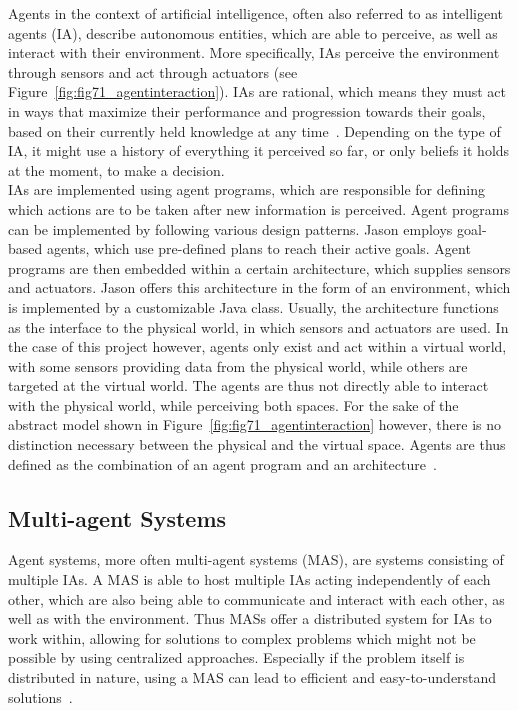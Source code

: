\documentclass[draft,final]{vutinfth} %
\begin{document}
Agents in the context of artificial intelligence, often also referred to as intelligent agents (IA), describe autonomous entities, which are able to perceive, as well as interact with their environment. 
More specifically, IAs perceive the environment through sensors and act through actuators (see Figure~\ref{fig:fig71_agentinteraction}). 
IAs are rational, which means they must act in ways that maximize their performance and progression towards their goals, based on their currently held knowledge at any time~\cite{russell2016artificial}. 
Depending on the type of IA, it might use a history of everything it perceived so far, or only beliefs it holds at the moment, to make a decision. \\
IAs are implemented using agent programs, which are responsible for defining which actions are to be taken after new information is perceived. 
Agent programs can be implemented by following various design patterns. 
Jason employs goal-based agents, which use pre-defined plans to reach their active goals. 
Agent programs are then embedded within a certain architecture, which supplies sensors and actuators.
Jason offers this architecture in the form of an environment, which is implemented by a customizable Java class. 
Usually, the architecture functions as the interface to the physical world, in which sensors and actuators are used. 
In the case of this project however, agents only exist and act within a virtual world, with some sensors providing data from the physical world, while others are targeted at the virtual world. 
The agents are thus not directly able to interact with the physical world, while perceiving both spaces. 
For the sake of the abstract model shown in Figure~\ref{fig:fig71_agentinteraction} however, there is no distinction necessary between the physical and the virtual space. 
Agents are thus defined as the combination of an agent program and an architecture~\cite{russell2016artificial}. 


\subsection{Multi-agent Systems}
\label{chap:mas}

Agent systems, more often multi-agent systems (MAS), are systems consisting of multiple IAs. 
A MAS is able to host multiple IAs acting independently of each other, which are also being able to communicate and interact with each other, as well as with the environment. 
Thus MASs offer a distributed system for IAs to work within, allowing for solutions to complex problems which might not be possible by using centralized approaches. 
Especially if the problem itself is distributed in nature, using a MAS can lead to efficient and easy-to-understand solutions~\cite{ferber1999multi}. 
\end{document}
